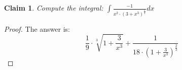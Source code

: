\documentclass{article}
\newtheorem{theorem}{Claim}
\begin{document}
\begin{theorem}
Compute the integral: $ \int \frac{ -1 }{ x^2 \cdot \left(3+x^3\right)^{\frac{ 5 }{ 3 }} }   dx $
\end{theorem}

\begin{proof}
The answer is:
\[
\frac{1}{9}\cdot\sqrt[3]{1+\frac{3}{x^3}}+\frac{1}{18\cdot\left(1+\frac{3}{x^3}\right)^{\frac{2}{3}}}
\]
\end{proof}
\end{document}
